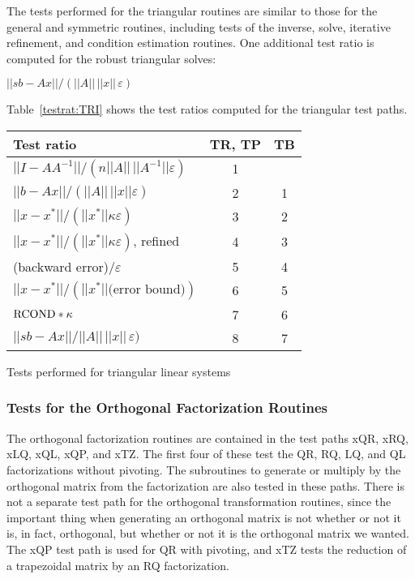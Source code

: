 The tests performed for the triangular routines are similar to those
for the general and symmetric routines, including tests of the 
inverse, solve, iterative refinement, and condition estimation routines.
One additional test ratio is computed for the robust triangular solves:
\begin{list}{}{}
\item $ || sb - Ax || / ( || A || \, || x || \, \varepsilon ) $
\end{list}
Table~\ref{testrat:TRI} shows the test ratios computed for the triangular
test paths.

\TS
\begin{tabular}{|l||c|c|} \hline
Test ratio & TR, TP & TB \\ \hline
$ || I - A A^{-1} || / ( n || A || \, || A^{-1} || \varepsilon )$ & 1 &    \\
$ || b - A x || / ( || A || \, || x || \varepsilon) $ & 2 & 1 \\
$ || x - x^* || / ( || x^* || \kappa \varepsilon ) $  & 3 & 2 \\
$ || x - x^* || / ( || x^* || \kappa \varepsilon )$, refined & 4 & 3 \\
(backward error)$ / \varepsilon $                     & 5 & 4 \\
$ || x - x^* || / ( || x^* || \mbox{(error bound)} ) $ & 6 & 5 \\
$ {\rm RCOND} * \kappa $                              & 7 & 6 \\
$ || s b - A x || / || A || \, || x || \, \varepsilon) $ & 8 & 7 \\ \hline
\end{tabular}
\caption{Tests performed for triangular linear systems}
\label{testrat:TRI}
\TE
\clearpage

\subsubsection{Tests for the Orthogonal Factorization Routines}
\dent
The orthogonal factorization routines are contained in the test paths
xQR, xRQ, xLQ, xQL, xQP, and xTZ.
The first four of these test the QR, RQ, LQ, and QL factorizations
without pivoting.
The subroutines to generate or multiply by the orthogonal matrix
from the factorization are also tested in these paths.
There is not a separate test path for the orthogonal transformation
routines, since the important thing when generating an orthogonal matrix
is not whether or not it is, in fact, orthogonal, but whether or not
it is the orthogonal matrix we wanted.
The xQP test path is used for QR with pivoting, and xTZ tests the
reduction of a trapezoidal matrix by an RQ factorization.

